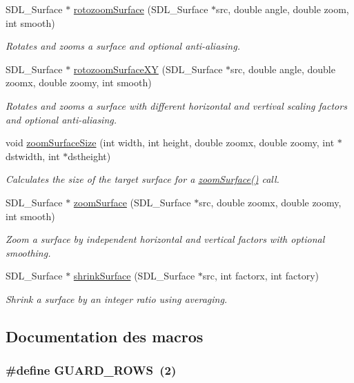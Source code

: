 \begin{DoxyCompactItemize}
SDL\_\-Surface $\ast$ \hyperlink{a00044_a5f64ed53eeee5f2667971c857698d1e5}{rotozoomSurface} (SDL\_\-Surface $\ast$src, double angle, double zoom, int smooth)
\begin{DoxyCompactList}\small\item\em Rotates and zooms a surface and optional anti-\/aliasing. \end{DoxyCompactList}\item 
SDL\_\-Surface $\ast$ \hyperlink{a00044_aab98b5b0da4ea468bacf47f7b85f0ee2}{rotozoomSurfaceXY} (SDL\_\-Surface $\ast$src, double angle, double zoomx, double zoomy, int smooth)
\begin{DoxyCompactList}\small\item\em Rotates and zooms a surface with different horizontal and vertival scaling factors and optional anti-\/aliasing. \end{DoxyCompactList}\item 
void \hyperlink{a00044_a8ba40859c1a977dae87488dd8be1bf9a}{zoomSurfaceSize} (int width, int height, double zoomx, double zoomy, int $\ast$dstwidth, int $\ast$dstheight)
\begin{DoxyCompactList}\small\item\em Calculates the size of the target surface for a \hyperlink{a00036_a06c8108f8fe8de77cf841c176ee64850}{zoomSurface()} call. \end{DoxyCompactList}\item 
SDL\_\-Surface $\ast$ \hyperlink{a00044_abdd772b2f6b1f26134e4e90cda657a21}{zoomSurface} (SDL\_\-Surface $\ast$src, double zoomx, double zoomy, int smooth)
\begin{DoxyCompactList}\small\item\em Zoom a surface by independent horizontal and vertical factors with optional smoothing. \end{DoxyCompactList}\item 
SDL\_\-Surface $\ast$ \hyperlink{a00044_aad3bf0cd89cc39ff874ffa778fa1495d}{shrinkSurface} (SDL\_\-Surface $\ast$src, int factorx, int factory)
\begin{DoxyCompactList}\small\item\em Shrink a surface by an integer ratio using averaging. \end{DoxyCompactList}\end{DoxyCompactItemize}


\subsection{Documentation des macros}
\hypertarget{a00044_a05a2601b7ea2906858ccc31b45fdc6eb}{
\subsubsection[{GUARD\_\-ROWS}]{\setlength{\rightskip}{0pt plus 5cm}\#define GUARD\_\-ROWS~(2)}}
\label{a00044_a05a2601b7ea2906858ccc31b45fdc6eb}


